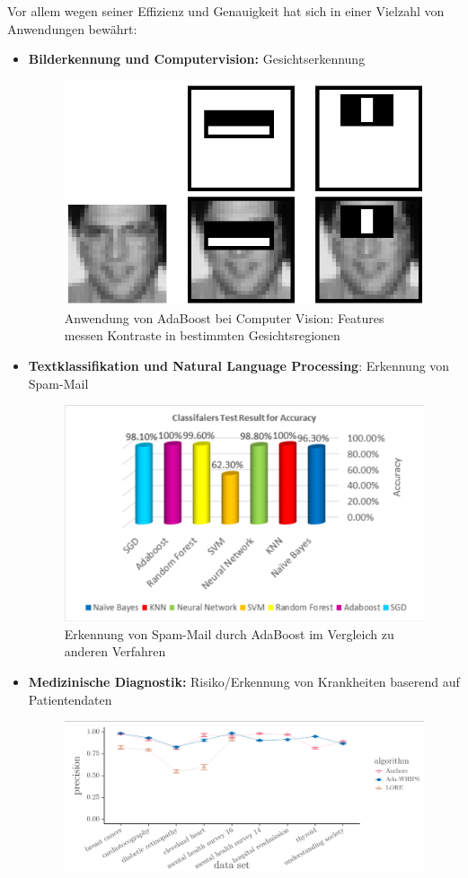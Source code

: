 Vor allem wegen seiner Effizienz und Genauigkeit hat sich  in einer Vielzahl
von Anwendungen bewährt:
\begin{itemize}
    \item \textbf{Bilderkennung und Computervision:} Gesichtserkennung~\cite{viola2001rapid}
          \begin{figure}
              \centering
              \includegraphics[width=.65\textwidth]{figures/CV_Example.png}
              \caption{Anwendung von AdaBoost bei Computer Vision:
                  Features messen Kontraste in bestimmten Gesichtsregionen\cite{viola2001rapid}}
          \end{figure}
    \item \textbf{Textklassifikation und Natural Language Processing}: Erkennung von Spam-Mail~\cite{panwar2022detection}
          \begin{figure}
              \centering
              \includegraphics[width=.65\textwidth]{figures/spam.png}
              \caption{Erkennung von Spam-Mail durch AdaBoost im Vergleich zu anderen Verfahren\cite{panwar2022detection}}
          \end{figure}
    \item \textbf{Medizinische Diagnostik:} Risiko/Erkennung von Krankheiten baserend auf Patientendaten~\cite{hatwell2020ada}
          \begin{figure}
              \centering
              \includegraphics[width=.65\textwidth]{figures/ada-whips.png}

\end{figure}
\end{itemize}
